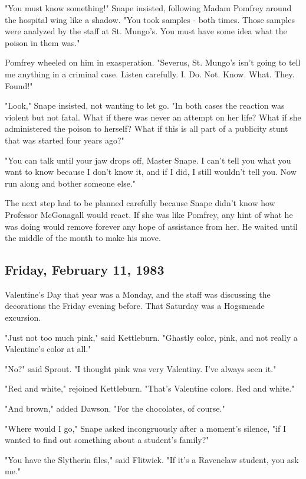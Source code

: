 \documentclass[a4paper,11pt]{article}
\begin{document}
"You must know something!" Snape insisted, following Madam Pomfrey around the hospital wing like a shadow. "You took samples - both times. Those samples were analyzed by the staff at St. Mungo's. You must have some idea what the poison in them was."

Pomfrey wheeled on him in exasperation. "Severus, St. Mungo's isn't going to tell me anything in a criminal case. Listen carefully. I. Do. Not. Know. What. They. Found!"

"Look," Snape insisted, not wanting to let go. "In both cases the reaction was violent but not fatal. What if there was never an attempt on her life? What if she administered the poison to herself? What if this is all part of a publicity stunt that was started four years ago?"

"You can talk until your jaw drops off, Master Snape. I can't tell you what you want to know because I don't know it, and if I did, I still wouldn't tell you. Now run along and bother someone else."

The next step had to be planned carefully because Snape didn't know how Professor McGonagall would react. If she was like Pomfrey, any hint of what he was doing would remove forever any hope of assistance from her. He waited until the middle of the month to make his move.

\subsection{Friday, February 11, 1983}

Valentine's Day that year was a Monday, and the staff was discussing the decorations the Friday evening before. That Saturday was a Hogsmeade excursion.

"Just not too much pink," said Kettleburn. "Ghastly color, pink, and not really a Valentine's color at all."

"No?" said Sprout. "I thought pink was very Valentiny. I've always seen it."

"Red and white," rejoined Kettleburn. "That's Valentine colors. Red and white."

"And brown," added Dawson. "For the chocolates, of course."

"Where would I go," Snape asked incongruously after a moment's silence, "if I wanted to find out something about a student's family?"

"You have the Slytherin files," said Flitwick. "If it's a Ravenclaw student, you ask me."
\end{document}

